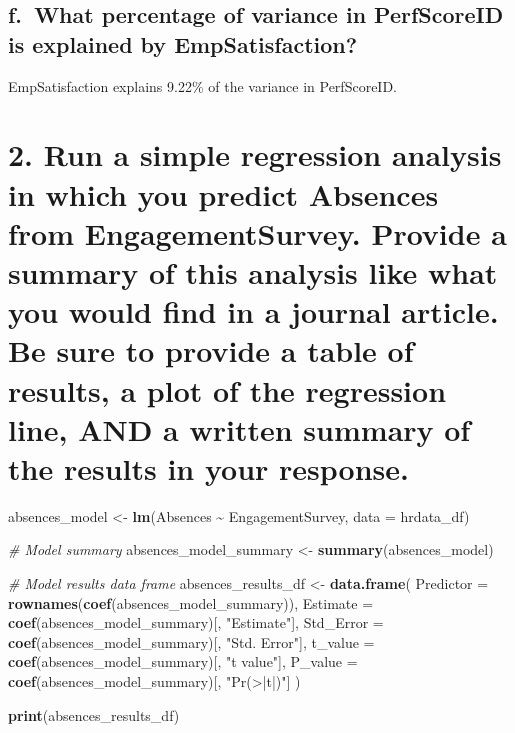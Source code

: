 \documentclass[
]{article}
\newenvironment{Shaded}{\begin{snugshade}}{\end{snugshade}}
\newcommand{\AttributeTok}[1]{\textcolor[rgb]{0.13,0.29,0.53}{#1}}
\newcommand{\CommentTok}[1]{\textcolor[rgb]{0.56,0.35,0.01}{\textit{#1}}}
\newcommand{\FunctionTok}[1]{\textcolor[rgb]{0.13,0.29,0.53}{\textbf{#1}}}
\newcommand{\NormalTok}[1]{#1}
\newcommand{\OtherTok}[1]{\textcolor[rgb]{0.56,0.35,0.01}{#1}}
\newcommand{\SpecialCharTok}[1]{\textcolor[rgb]{0.81,0.36,0.00}{\textbf{#1}}}
\newcommand{\StringTok}[1]{\textcolor[rgb]{0.31,0.60,0.02}{#1}}
\begin{document}
\subsection{f.~What percentage of variance in PerfScoreID is explained
by
EmpSatisfaction?}\label{f.-what-percentage-of-variance-in-perfscoreid-is-explained-by-empsatisfaction}

EmpSatisfaction explains 9.22\% of the variance in PerfScoreID.

\section{2. Run a simple regression analysis in which you predict
Absences from EngagementSurvey. Provide a summary of this analysis like
what you would find in a journal article. Be sure to provide a table of
results, a plot of the regression line, AND a written summary of the
results in your
response.}\label{run-a-simple-regression-analysis-in-which-you-predict-absences-from-engagementsurvey.-provide-a-summary-of-this-analysis-like-what-you-would-find-in-a-journal-article.-be-sure-to-provide-a-table-of-results-a-plot-of-the-regression-line-and-a-written-summary-of-the-results-in-your-response.}

\begin{Shaded}
\begin{Highlighting}[]
\NormalTok{absences\_model }\OtherTok{\textless{}{-}} \FunctionTok{lm}\NormalTok{(Absences }\SpecialCharTok{\textasciitilde{}}\NormalTok{ EngagementSurvey, }\AttributeTok{data =}\NormalTok{ hrdata\_df)}

\CommentTok{\# Model summary}
\NormalTok{absences\_model\_summary }\OtherTok{\textless{}{-}} \FunctionTok{summary}\NormalTok{(absences\_model)}

\CommentTok{\# Model results data frame}
\NormalTok{absences\_results\_df }\OtherTok{\textless{}{-}} \FunctionTok{data.frame}\NormalTok{(}
  \AttributeTok{Predictor =} \FunctionTok{rownames}\NormalTok{(}\FunctionTok{coef}\NormalTok{(absences\_model\_summary)),}
  \AttributeTok{Estimate =} \FunctionTok{coef}\NormalTok{(absences\_model\_summary)[, }\StringTok{"Estimate"}\NormalTok{],}
  \AttributeTok{Std\_Error =} \FunctionTok{coef}\NormalTok{(absences\_model\_summary)[, }\StringTok{"Std. Error"}\NormalTok{],}
  \AttributeTok{t\_value =} \FunctionTok{coef}\NormalTok{(absences\_model\_summary)[, }\StringTok{"t value"}\NormalTok{],}
  \AttributeTok{P\_value =} \FunctionTok{coef}\NormalTok{(absences\_model\_summary)[, }\StringTok{"Pr(\textgreater{}|t|)"}\NormalTok{]}
\NormalTok{)}

\FunctionTok{print}\NormalTok{(absences\_results\_df)}
\end{Highlighting}
\end{Shaded}
\end{document}
